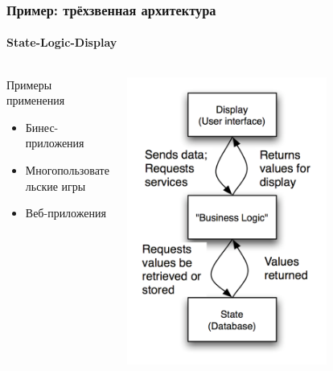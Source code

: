 \documentclass{../cscslides}
\begin{document}
    \begin{frame}
        \frametitle{Пример: трёхзвенная архитектура}
        \framesubtitle{State-Logic-Display}
        \begin{columns}
            \begin{column}{0.5\textwidth}
                Примеры применения
                \begin{itemize}
                    \item Бинес-приложения
                    \item Многопользовательские игры
                    \item Веб-приложения
                \end{itemize}
            \end{column}
            \begin{column}{0.5\textwidth}
                \begin{center}
                    \includegraphics[width=0.7\textwidth]{threeTieredArchitecture.png}
                \end{center}
            \end{column}
        \end{columns}
    \end{frame}
\end{document}
